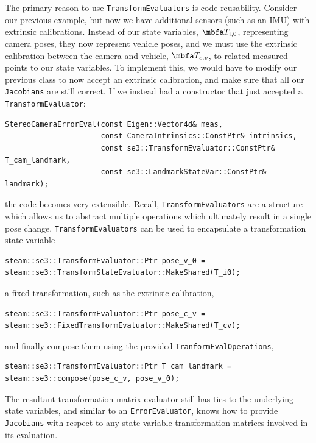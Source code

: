 \documentclass[10pt,letterpaper,fleqn,oneside]{article}
\newcommand{\code}[1]{\texttt{#1}}
\begin{document}
The primary reason to use \code{TransformEvaluators} is code reusability.
Consider our previous example, but now we have additional sensors (such as an IMU) with extrinsic calibrations.
Instead of our state variables, $\mbf{T}_{i,0}$, representing camera poses, they now represent vehicle poses, and we must use the extrinsic calibration between the camera and vehicle, $\mbf{T}_{c,v}$, to related measured points to our state variables.
To implement this, we would have to modify our previous class to now accept an extrinsic calibration, and make sure that all our \code{Jacobians} are still correct.
If we instead had a constructor that just accepted a \code{TransformEvaluator}:
%
\begin{lstlisting}
StereoCameraErrorEval(const Eigen::Vector4d& meas,
                      const CameraIntrinsics::ConstPtr& intrinsics,
                      const se3::TransformEvaluator::ConstPtr& T_cam_landmark,
                      const se3::LandmarkStateVar::ConstPtr& landmark);
\end{lstlisting}
%
the code becomes very extensible.
Recall, \code{TransformEvaluators} are a structure which allows us to abstract multiple operations which ultimately result in a single pose change.
\code{TransformEvaluators} can be used to encapsulate a transformation state variable
%
\begin{lstlisting}
steam::se3::TransformEvaluator::Ptr pose_v_0 = steam::se3::TransformStateEvaluator::MakeShared(T_i0);
\end{lstlisting}
%
a fixed transformation, such as the extrinsic calibration,
%
\begin{lstlisting}
steam::se3::TransformEvaluator::Ptr pose_c_v = steam::se3::FixedTransformEvaluator::MakeShared(T_cv);
\end{lstlisting}
%
and finally compose them using the provided \code{TranformEvalOperations},
%
\begin{lstlisting}
steam::se3::TransformEvaluator::Ptr T_cam_landmark = steam::se3::compose(pose_c_v, pose_v_0);
\end{lstlisting}
%
The resultant transformation matrix evaluator still has ties to the underlying state variables, and similar to an \code{ErrorEvaluator}, knows how to provide \code{Jacobians} with respect to any state variable transformation matrices involved in its evaluation.
\end{document}
